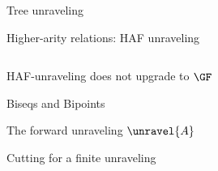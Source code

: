 \documentclass[aspectratio=169]{beamer}
\begin{document}

\begin{frame}{Tree unraveling}
  \begin{center}
    
  \end{center}
\end{frame}


\begin{frame}{Higher-arity relations: HAF unraveling}
  
  

  \begin{columns}
    \begin{column}{0.2\textwidth}
      \begin{overprint}


      \end{overprint}
    \end{column}
    \begin{column}{0.75\textwidth}
      \begin{overprint}
        \exunravelstruct{}


        \exunravelhat{}
      \end{overprint}
    \end{column}
  \end{columns}
\end{frame}

\begin{frame}{HAF-unraveling does not upgrade to $\GF$}
  
\end{frame}

\begin{frame}{Biseqs and Bipoints}
  
\end{frame}

\begin{frame}{The forward unraveling $\unravel{A}$}
  
\end{frame}

\begin{frame}{Cutting for a finite unraveling}
  \begin{center}
    
  \end{center}
\end{frame}
\end{document}
